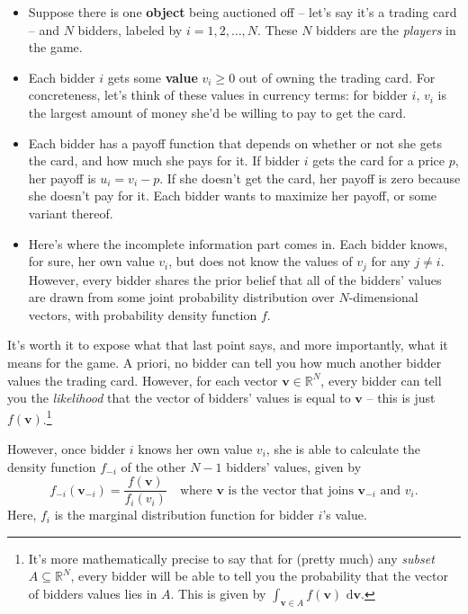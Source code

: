 \documentclass[12pt]{article}
\newcommand{\bbR}{\mathbb{R}}
\theoremstyle{definition}
\theoremstyle{remark}
\theoremstyle{plain}                          %
\begin{document}
\begin{itemize}[nosep]
  \item Suppose there is one \textbf{object} being auctioned off -- let's say it's a trading card -- and $N$ bidders, labeled by $i=1,2,\dots,N$. These $N$ bidders are the \textit{players} in the game.
  \item Each bidder $i$ gets some \textbf{value} $v_i \ge 0$ out of owning the trading card. For concreteness, let's think of these values in currency terms: for bidder $i$, $v_i$ is the largest amount of money she'd be willing to pay to get the card.
  \item Each bidder has a payoff function that depends on whether or not she gets the card, and how much she pays for it. If bidder $i$ gets the card for a price $p$, her payoff is $u_i=v_i-p$. If she doesn't get the card, her payoff is zero because she doesn't pay for it. Each bidder wants to maximize her payoff, or some variant thereof.
  \item Here's where the incomplete information part comes in. Each bidder knows, for sure, her own value $v_i$, but does not know the values of $v_j$ for any $j \neq i$. However, every bidder shares the prior belief that all of the bidders' values are drawn from some joint probability distribution over $N$-dimensional vectors, with probability density function $f$.
\end{itemize}

\noindent It's worth it to expose what that last point says, and more importantly, what it means for the game. A priori, no bidder can tell you how much another bidder values the trading card. However, for each vector $\mathbf v \in \bbR^N$, every bidder can tell you the \textit{likelihood} that the vector of bidders' values is equal to $\mathbf v$ -- this is just $f(\mathbf v)$.\footnote{It's more mathematically precise to say that for (pretty much) any \textit{subset} $A \subseteq \bbR^N$, every bidder will be able to tell you the probability that the vector of bidders values lies in $A$. This is given by $\int_{\mathbf v \in A} f(\mathbf v) \text{ d}\mathbf v$.}

However, once bidder $i$ knows her own value $v_i$, she is able to calculate the density function $f_{-i}$ of the other $N-1$ bidders' values, given by $$f_{-i}(\mathbf v_{-i})=\dfrac{f(\mathbf v)}{f_i(v_i)} \quad \text{where } \mathbf v \text{ is the vector that joins } \mathbf v_{-i} \text{ and } v_i.$$ Here, $f_i$ is the marginal distribution function for bidder $i$'s value.
\end{document}
